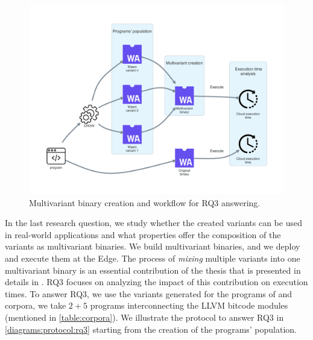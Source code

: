 
\section{\rqthree}
\label{rq3:method}

\newcommand{\mewe}{MEWE\xspace}

\begin{figure}[h]
    \centering
    \includegraphics[width=0.8\linewidth]{diagrams/Rq3.pdf}
    \caption{Multivariant binary creation and workflow for RQ3 answering.}
    \label{diagrams:protocol:rq3}
\end{figure}

In the last research question, we study whether the created variants can be used in real-world applications and what properties offer the composition of the variants as multivariant binaries. We build multivariant binaries, and we deploy and execute them at the Edge. The process of \emph{mixing} multiple variants into one multivariant binary is an essential contribution of the thesis that is presented in details in \cite{2021arXiv210808125C}. RQ3 focuses on analyzing the impact of this contribution on execution times. To answer RQ3, we use the variants generated for the programs of \corpussodium and \corpusqrcode corpora, we take $2 + 5$ programs interconnecting the LLVM bitcode modules (mentioned in \autoref{table:corpora}). We illustrate the protocol to answer RQ3 in \autoref{diagrams:protocol:rq3} starting from the creation of the programs' population.




